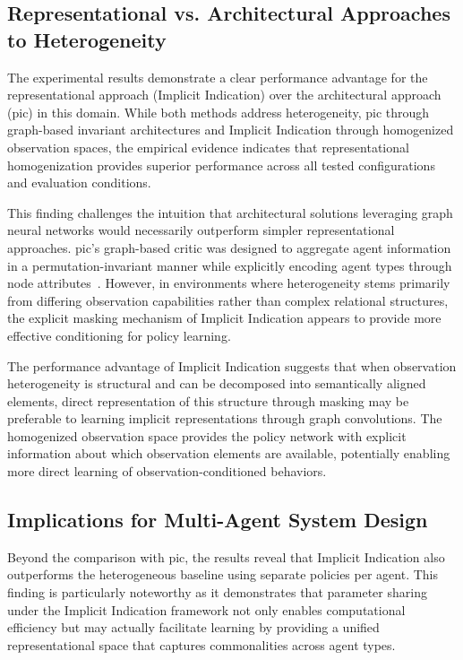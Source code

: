 \documentclass[conference]{IEEEtran}
\begin{document}
\subsection{Representational vs. Architectural Approaches to Heterogeneity}

The experimental results demonstrate a clear performance advantage for 
the representational approach (Implicit Indication) over the architectural 
approach (\gls{pic}) in this domain. While both methods address heterogeneity, 
\gls{pic} through graph-based invariant architectures and Implicit Indication 
through homogenized observation spaces, the empirical evidence indicates that 
representational homogenization provides superior performance across all 
tested configurations and evaluation conditions.

This finding challenges the intuition that architectural solutions leveraging 
graph neural networks would necessarily outperform simpler representational approaches. 
\gls{pic}'s graph-based critic was designed to aggregate agent information in a 
permutation-invariant manner while explicitly encoding agent types through node 
attributes~\cite{liu2020b}. However, in environments where heterogeneity stems 
primarily from differing observation capabilities rather than complex relational 
structures, the explicit masking mechanism of Implicit Indication appears to provide 
more effective conditioning for policy learning.

The performance advantage of Implicit Indication suggests that when observation 
heterogeneity is structural and can be decomposed into semantically aligned elements, 
direct representation of this structure through masking may be preferable to 
learning implicit representations through graph convolutions. 
The homogenized observation space provides the policy network with explicit information 
about which observation elements are available, potentially enabling more 
direct learning of observation-conditioned behaviors.

\subsection{Implications for Multi-Agent System Design}

Beyond the comparison with \gls{pic}, the results reveal that Implicit Indication 
also outperforms the heterogeneous baseline using separate policies per agent. 
This finding is particularly noteworthy as it demonstrates that parameter 
sharing under the Implicit Indication framework not only enables computational 
efficiency but may actually facilitate learning by providing a unified 
representational space that captures commonalities across agent types.
\end{document}

